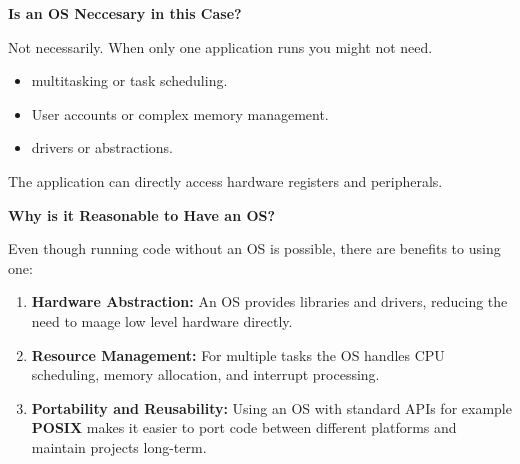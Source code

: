 \documentclass{article}
\newcommand{\bo}[1]{\textbf{#1}}
\begin{document}
\bo{Is an OS Neccesary in this Case?}

Not necessarily. When only one application runs you might not need.
\begin{itemize}
  \item multitasking or task scheduling.
  \item User accounts or complex memory management.
  \item drivers or abstractions.
\end{itemize}
The application can directly access hardware registers and peripherals.


\bo{Why is it Reasonable to Have an OS?}

Even though running code without an OS is possible, there are benefits to using one:

\begin{enumerate}
  \item \bo{Hardware Abstraction:} An OS provides libraries and drivers, 
        reducing the need to maage low level hardware directly.
  \item \bo{Resource Management:} For multiple tasks 
        the OS handles CPU scheduling, memory allocation, and interrupt processing.
  \item \bo{Portability and Reusability:} Using an OS with standard APIs for example \bo{POSIX}
        makes it easier to port code between different platforms and maintain projects long-term.
\end{enumerate}
\end{document}
